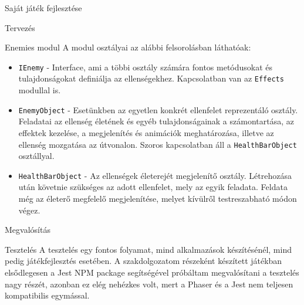 \begin{MyChapter}{Saját játék fejlesztése}
\begin{MySection}{Tervezés}
\begin{MySubSection}{Enemies modul}
			A modul osztályai az alábbi felsorolásban láthatóak:
			\begin{itemize}			
				\item \texttt{IEnemy} - Interface, ami a többi osztály számára fontos metódusokat és tulajdonságokat definiálja az ellenségekhez. Kapcsolatban van az \texttt{Effects} modullal is.
				
				\item \texttt{EnemyObject} - Esetünkben az egyetlen konkrét ellenfelet reprezentáló osztály. Feladatai az ellenség életének és egyéb tulajdonságainak a számontartása, az effektek kezelése, a megjelenítés és animációk meghatározása, illetve az ellenség mozgatása az útvonalon. Szoros kapcsolatban áll a \texttt{HealthBarObject} osztállyal.
				
				\item \texttt{HealthBarObject} - Az ellenségek életerejét megjelenítő osztály. Létrehozása után követnie szükséges az adott ellenfelet, mely az egyik feladata. Feldata még az életerő megfelelő megjelenítése, melyet kívülről testreszabható módon végez.
				
			\end{itemize}
		\end{MySubSection}

	\end{MySection}
		
	\begin{MySection}{Megvalósítás}
		
		
		
	\end{MySection}
		
	\begin{MySection}{Tesztelés}
		A tesztelés egy fontos folyamat, mind alkalmazások készítésénél, mind pedig játékfejlesztés esetében. 
		A szakdolgozatom részeként készített játékban elsődlegesen a Jest NPM package segítségével próbáltam megvalósítani a tesztelés nagy részét, azonban ez elég nehézkes volt, mert a Phaser és a Jest nem teljesen kompatibilis egymással.
				

\end{MySection}
\end{MyChapter}
